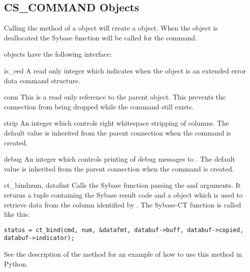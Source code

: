 \subsection{CS_COMMAND Objects}

Calling the  method of a 
object will create a  object.  When the
 object is deallocated the Sybase
 function will be called for the command.

 objects have the following interface:

\begin{memberdesc}[CS_COMMAND]{is_eed}
A read only integer which indicates when the  object
is an extended error data command structure.
\end{memberdesc}

\begin{memberdesc}[CS_COMMAND]{conn}
This is a read only reference to the parent 
object.  This prevents the connection from being dropped while the
command still exists.
\end{memberdesc}

\begin{memberdesc}[CS_COMMAND]{strip}
An integer which controls right whitespace stripping of 
columns.  The default value is inherited from the parent connection
when the command is created.
\end{memberdesc}

\begin{memberdesc}[CS_COMMAND]{debug}
An integer which controls printing of debug messages to .
The default value is inherited from the parent connection when the
command is created.
\end{memberdesc}

\begin{methoddesc}[CS_COMMAND]{ct_bind}{num, datafmt}
Calls the Sybase  function passing the 
and  arguments.  It returns a tuple containing the Sybase
result code and a  object which is used to retrieve
data from the column identified by .  The Sybase-CT
 function is called like this:

\begin{verbatim}
status = ct_bind(cmd, num, &datafmt, databuf->buff, databuf->copied, databuf->indicator);
\end{verbatim}

See the description of the  method for an
example of how to use this method in Python.
\end{methoddesc}


